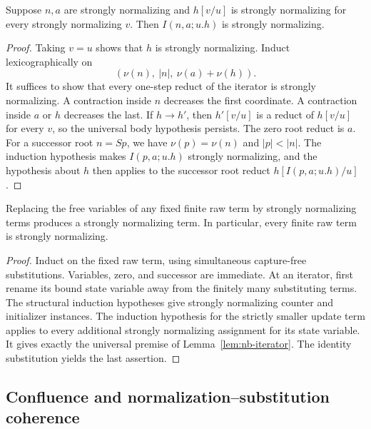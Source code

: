 \begin{lemma}
\label{lem:nb-iterator}
Suppose $n,a$ are strongly normalizing and $h[v/u]$ is strongly normalizing
for every strongly normalizing $v$. Then $I(n,a;u.h)$ is strongly
normalizing.
\end{lemma}
\begin{proof}
Taking $v=u$ shows that $h$ is strongly normalizing. Induct
lexicographically on
\[
            (\nu(n),\ |n|,\ \nu(a)+\nu(h)).
\]
It suffices to show that every one-step reduct of the iterator is strongly
normalizing. A contraction inside $n$ decreases the first coordinate.
A contraction inside $a$ or $h$ decreases the last. If $h\to h'$, then
$h'[v/u]$ is a reduct of $h[v/u]$ for every $v$, so the universal body
hypothesis persists. The zero root reduct is $a$. For a successor root
$n=Sp$, we have $\nu(p)=\nu(n)$ and $|p|<|n|$. The induction hypothesis
makes $I(p,a;u.h)$ strongly normalizing, and the hypothesis about $h$
then applies to the successor root reduct
$h[I(p,a;u.h)/u]$.
\end{proof}

\begin{theorem}
\label{thm:nb-sn}
Replacing the free variables of any fixed finite raw term by strongly
normalizing terms produces a strongly normalizing term. In particular,
every finite raw term is strongly normalizing.
\end{theorem}
\begin{proof}
Induct on the fixed raw term, using simultaneous capture-free substitutions.
Variables, zero, and successor are immediate. At an iterator, first rename
its bound state variable away from the finitely many substituting terms.
The structural induction hypotheses give strongly normalizing counter and
initializer instances. The induction hypothesis for the strictly smaller
update term applies to every additional strongly normalizing assignment
for its state variable. It gives exactly the universal premise of
Lemma~\ref{lem:nb-iterator}. The identity substitution yields the last
assertion.
\end{proof}

\subsection{Confluence and normalization--substitution coherence}

